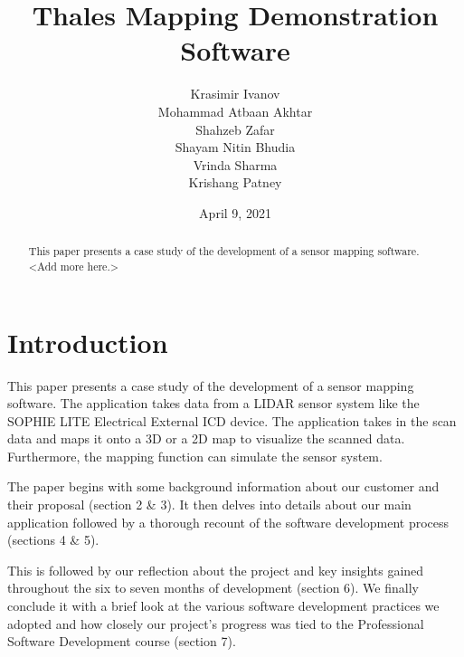 \documentclass{l3proj}
\begin{document}
\title{Thales Mapping Demonstration Software}

    \author{Krasimir Ivanov\\
        Mohammad Atbaan Akhtar \\
        Shahzeb Zafar \\
        Shayam Nitin Bhudia \\
        Vrinda Sharma\\ 
        Krishang Patney\\}

\date{April 9, 2021}

\maketitle

\begin{abstract}

This paper presents a case study of the development of a sensor mapping software.   
<Add more here.>

\end{abstract}

\educationalconsent

\newpage

\section{Introduction}

This paper presents a case study of the development of a sensor mapping software. The application takes data from a LIDAR sensor system like the SOPHIE LITE Electrical External ICD device. The application takes in the scan data and maps it onto a 3D or a 2D map to visualize the scanned data. Furthermore, the mapping function can simulate the sensor system.

The paper begins with some background information about our customer and their proposal (section 2 \& 3). It then delves into details about our main application followed by a thorough recount of the software development process (sections 4 \& 5). 

This is followed by our reflection about the project and key insights gained throughout the six to seven months of development (section 6). We finally conclude it with a brief look at the various software development practices we adopted and how closely our project’s progress was tied to the Professional Software Development course (section 7).
\end{document}
